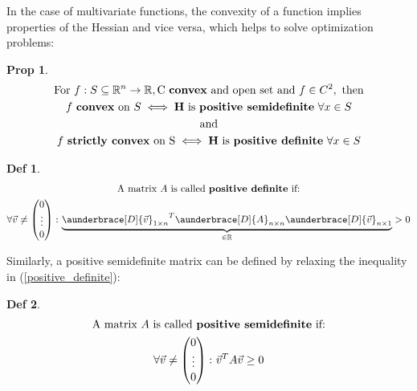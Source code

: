 \documentclass[../convex_optimization.tex]{subfiles}
\theoremstyle{definition} \newtheorem{defi}{Def}
\theoremstyle{definition} \newtheorem{prop}{Prop}
\begin{document}
In the case of multivariate functions, the convexity of a function
implies properties of the Hessian and vice versa, which
helps to solve optimization problems:
\begin{prop}
\begin{gather}
    \text{For } f: S \subseteq \mathbb R^n \to \mathbb R,
    \text{C \textbf{convex} and open set and } f \in C^2,
    \text{ then}\nonumber\\
    f \text{ \textbf{convex} on }S \iff
    \mathbf H \text{ is \textbf{positive semidefinite} } \forall x \in S\label{hessian_convex}\\
    \text{and}\nonumber\\
    f \text{ \textbf{strictly convex} on S} \iff
    \mathbf H \text{ is \textbf{positive definite} } \forall x \in S
\end{gather}
\end{prop}
\begin{defi}
\begin{gather}
    \text{A matrix $A$ is called \textbf{positive definite} if:}
    \nonumber\\
    \forall \vec{v} \neq 
    \begin{pmatrix} 0 \\ \vdots \\ 0
    \end{pmatrix}\colon
    \rlap{\ensuremath{\underbrace{\phantom{
                    {\aunderbrace[D]{\vec{v}}_{1\times n}}^T
                    \aunderbrace[D]{A}_{n\times n}
                    \aunderbrace[D]{\vec{v}}_{n\times 1}
    }}_{\in \mathbb R}}}
    {\aunderbrace[D]{\vec{v}}_{1\times n}}^T
    \aunderbrace[D]{A}_{n\times n}
    \aunderbrace[D]{\vec{v}}_{n\times 1}
    > 0
    \label{positive_definite}
\end{gather}
\end{defi}
Similarly, a positive semidefinite matrix can be defined by relaxing the inequality in (\ref{positive_definite}):
\begin{defi}
\begin{gather}
    \text{A matrix $A$ is called \textbf{positive semidefinite} if:}
    \nonumber\\
    \forall \vec{v} \neq 
    \begin{pmatrix} 0 \\ \vdots \\ 0
    \end{pmatrix}\colon
    \vec{v}^T\space A\space \vec{v} \geq 0
\end{gather}
\end{defi}
\end{document}
